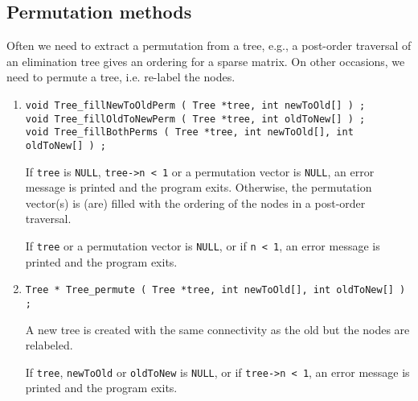 \subsection{Permutation methods}
\label{subsection:Tree:proto:permutation}
\par
Often we need to extract a permutation from a tree, e.g., a
post-order traversal of an elimination tree gives an ordering for a
sparse matrix.
On other occasions, we need to permute a tree, i.e. re-label
the nodes.
\par
\begin{enumerate}
\item
\begin{verbatim}
void Tree_fillNewToOldPerm ( Tree *tree, int newToOld[] ) ;
void Tree_fillOldToNewPerm ( Tree *tree, int oldToNew[] ) ;
void Tree_fillBothPerms ( Tree *tree, int newToOld[], int oldToNew[] ) ;
\end{verbatim}
If {\tt tree} is {\tt NULL}, 
{\tt tree->n < 1} or a permutation vector is {\tt NULL},
an error message is printed and the program exits.
Otherwise, the permutation vector(s) is (are) filled with the
ordering of the nodes in a post-order traversal.
\par {}
If {\tt tree} or a permutation vector is {\tt NULL}, 
or if {\tt n < 1},
an error message is printed and the program exits.
\item
\begin{verbatim}
Tree * Tree_permute ( Tree *tree, int newToOld[], int oldToNew[] ) ;
\end{verbatim}
A new tree is created with the same connectivity as the
old but the nodes are relabeled.
\par {}
If {\tt tree}, {\tt newToOld} or {\tt oldToNew} is {\tt NULL}, 
or if {\tt tree->n < 1},
an error message is printed and the program exits.
\end{enumerate}
\par
